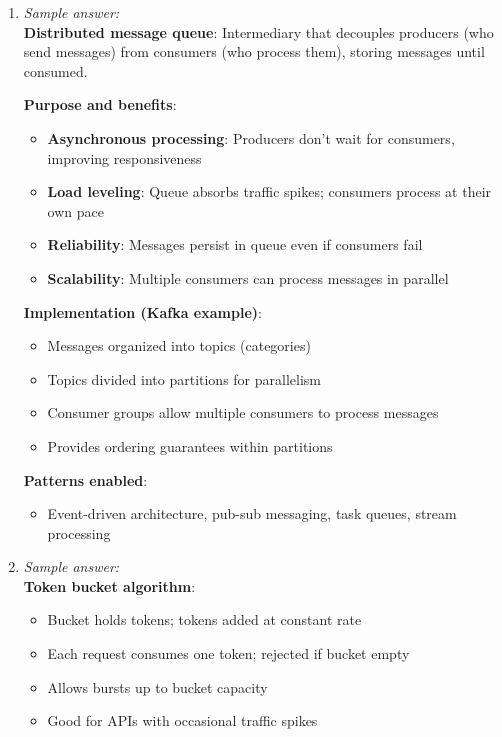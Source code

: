 \documentclass[11pt]{article}
\begin{document}
\begin{enumerate}[label=\textbf{\arabic*.}]
  \item \emph{Sample answer:}\\
  \textbf{Distributed message queue}: Intermediary that decouples producers (who send messages) 
  from consumers (who process them), storing messages until consumed.

  \textbf{Purpose and benefits}:
  \begin{itemize}
    \item \textbf{Asynchronous processing}: Producers don't wait for consumers, improving responsiveness
    \item \textbf{Load leveling}: Queue absorbs traffic spikes; consumers process at their own pace
    \item \textbf{Reliability}: Messages persist in queue even if consumers fail
    \item \textbf{Scalability}: Multiple consumers can process messages in parallel
  \end{itemize}

  \textbf{Implementation (Kafka example)}:
  \begin{itemize}
    \item Messages organized into topics (categories)
    \item Topics divided into partitions for parallelism
    \item Consumer groups allow multiple consumers to process messages
    \item Provides ordering guarantees within partitions
  \end{itemize}

  \textbf{Patterns enabled}:
  \begin{itemize}
    \item Event-driven architecture, pub-sub messaging, task queues, stream processing
  \end{itemize}

  \item \emph{Sample answer:}\\
  \textbf{Token bucket algorithm}:
  \begin{itemize}
    \item Bucket holds tokens; tokens added at constant rate
    \item Each request consumes one token; rejected if bucket empty
    \item Allows bursts up to bucket capacity
    \item Good for APIs with occasional traffic spikes
  \end{itemize}


\end{enumerate}
\end{document}
